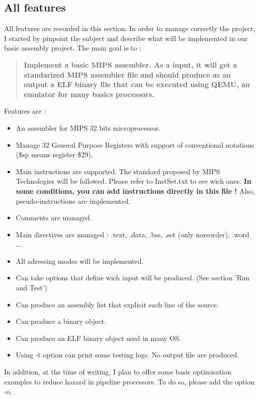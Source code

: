 \documentclass[twoside,twocolumn]{article}
\begin{document}
\subsection{All features}

All features are recorded in this section. In order to manage correctly the project, I started by pinpoint the subject and describe what will be implemented in our basic assembly project. The main goal is to :

\begin{quotation}
 \textbf{Implement a basic MIPS assembler. As a input, it will get a standarized MIPS assembler file and should produce as an output a ELF binary file that can be executed using QEMU, an emulator for many basics processors.}
\end{quotation}

Features are :

\begin{itemize}
 \item An assembler for MIPS 32 bits microprocessor.
 \item Manage 32 General Purpose Registers with support of conventional notations (\$sp means register \$29).
 \item Main instructions are supported. The standard proposed by MIPS Technologies will be followed. Please refer to InstSet.txt to see wich ones. \textbf{ In some conditions, you can add instructions directly in this file ! } Also, pseudo-instructions are implemented.
 \item Comments are managed.
 \item Main directives are managed : .text, .data, .bss, .set (only noreorder), .word ...
 \item All adressing modes will be implemented.
 \item Can take options that define wich input will be produced. (See section 'Run and Test')
 \item Can produce an assembly list that explicit each line of the source.
 \item Can produce a binary object.
 \item Can produce an ELF binary object used in many OS.
 \item Using -t option can print some testing logs. No output file are produced.
\end{itemize}

In addition, at the time of writing, I plan to offer some basic optimisation examples to reduce hazard in pipeline processors. To do so, please add the option -o.
\end{document}
